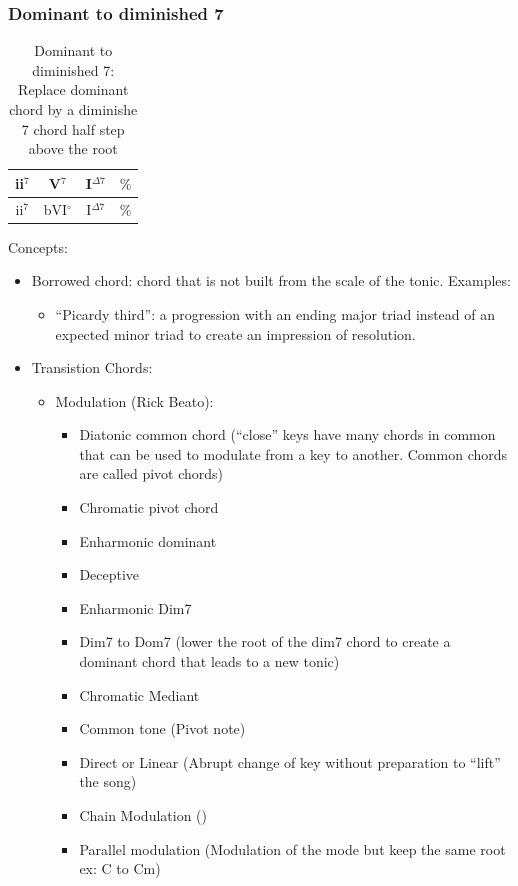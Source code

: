 \documentclass{article}
\begin{document}
\subsubsection{Dominant to diminished 7}
\begin{table}[!h]
	\caption{Dominant to diminished 7: Replace dominant chord by a diminishe 7 chord half step above the root}
	\centering
	\begin{tabular}{| c | c | c | c |}
		\hline
		\phantom{x}ii$^7$\phantom{x} & \phantom{x}V$^7$\phantom{x} & \phantom{x}I$^{\Delta 7}$\phantom{x}  & \phantom{x}$\%$\phantom{x} \\
		\hline
		\phantom{x}ii$^7$\phantom{x} & \phantom{x}bVI$^\circ$\phantom{x} & \phantom{x}I$^{\Delta 7}$\phantom{x}  & \phantom{x}$\%$\phantom{x} \\
		\hline
	\end{tabular}
	\label{tab:tritone-subs }
\end{table}

Concepts:
\begin{itemize}
	\item Borrowed chord: chord that is not built from the scale of the tonic. Examples:
	\begin{itemize}
		\item ``Picardy third'': a progression with an ending major triad instead of an expected minor triad to create an impression of resolution.
	\end{itemize}
	\item Transistion Chords:
	\begin{itemize}
		\item Modulation (Rick Beato):
		\begin{itemize}
			\item Diatonic common chord (``close'' keys have many chords in common that can be used to modulate from a key to another. Common chords are called pivot chords)
			\item Chromatic pivot chord
			\item Enharmonic dominant
			\item Deceptive
			\item Enharmonic Dim7
			\item Dim7 to Dom7 (lower the root of the dim7 chord to create a dominant chord that leads to a new tonic)
			\item Chromatic Mediant
			\item Common tone (Pivot note)
			\item Direct or Linear (Abrupt change of key without preparation to ``lift'' the song)
			\item Chain Modulation ()
			\item Parallel modulation (Modulation of the mode but keep the same root ex: C to Cm)
		\end{itemize}
	\end{itemize}
\end{itemize}
\end{document}
